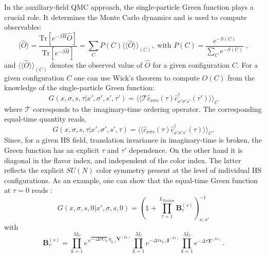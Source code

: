 In the auxiliary-field QMC approach, the single-particle Green function plays a crucial role.  It determines the Monte Carlo dynamics and is used to compute  observables:
\begin{equation}\label{eqn:obs}
\langle \hat{O}  \rangle  = \frac{ \text{Tr}   \left[ e^{- \beta \hat{H}}  \hat{O}  \right] }{ \text{Tr}   \left[ e^{- \beta \hat{H}}  \right] } =   \sum_{C}   P(C) 
   \langle \langle \hat{O}  \rangle \rangle_{(C)} , \text{   with   } 
  P(C)   = \frac{ e^{-S(C)}}{\sum_C e^{-S(C)}}\;,
\end{equation}
and $\langle \langle \hat{O}  \rangle \rangle_{(C)} $ denotes the observed value of $\hat{O}$ for a given configuration $C$.
For a given configuration $C$  one can use Wick's theorem to compute $O (C) $   from the knowledge of the single-particle Green function: 
\begin{equation}
       G( x,\sigma,s, \tau |    x',\sigma',s', \tau')   =       \langle \langle \mathcal{T} \hat{c}^{\phantom\dagger}_{x \sigma s} (\tau)  \hat{c}^{\dagger}_{x' \sigma' s'} (\tau') \rangle \rangle_{C}
\end{equation}
where $ \mathcal{T} $ corresponds to the imaginary-time ordering operator.   The  corresponding equal-time quantity reads, 
\begin{equation}
       G( x,\sigma,s, \tau |    x',\sigma',s', \tau)   =       \langle \langle  \hat{c}^{\phantom\dagger}_{x \sigma s} (\tau)  \hat{c}^{\dagger}_{x' \sigma' s'} (\tau) \rangle \rangle_{C}.
\end{equation}
Since, for a given HS field, translation invariance in imaginary-time is broken, the Green function has an explicit $\tau$ and $\tau'$ dependence.   On the other hand it is diagonal in the flavor index, and independent of the color index. The latter reflects the  explicit $SU(N)$   color symmetry present at the level of individual HS configurations.   As an example,  one can show that the equal-time Green function at $\tau = 0$ reads \cite{Assaad08_rev}:
\begin{equation}\label{eqn:Green_eq}
G(x,\sigma,s,0| x',\sigma,s,0 )  =   \left(  \mathds{1}  +  \prod_{\tau = 1}^{L_{\text{Trotter}}}  \bm{B}_{\tau}^{(s)}   \right)^{-1}_{x,x'}
\end{equation}
with
\begin{equation}
\label{Btau.eq}
	\bm{B}_{\tau}^{(s)} =   
    \prod_{k=1}^{M_V}   e^{  \sqrt{ -\Delta \tau  U_k} \eta_{k,\tau} {\bm V}^{(ks)} }   \prod_{k=1}^{M_I}   e^{  -\Delta \tau s_{k,\tau}  {\bm I}^{(ks)}}
    \prod_{k=1}^{M_T}   e^{-\Delta \tau {\bm T}^{(ks)}} .
\end{equation}


